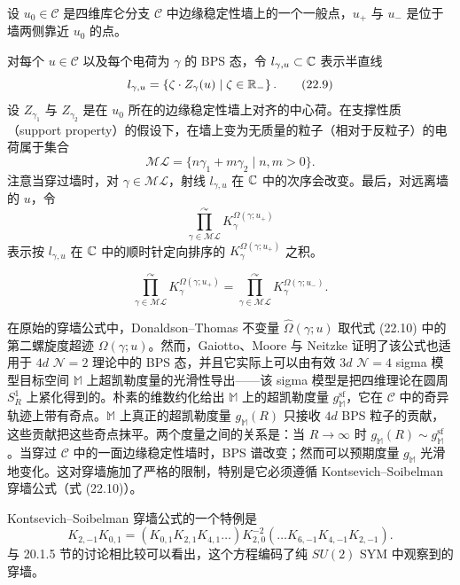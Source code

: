 设 $u_0\in\mathcal{C}$ 是四维库仑分支 $\mathcal{C}$ 中边缘稳定性墙上的一个一般点，$u_+$ 与 $u_-$ 是位于墙两侧靠近 $u_0$ 的点。

对每个 $u\in\mathcal{C}$ 以及每个电荷为 $\gamma$ 的 BPS 态，令 $l_{\gamma,u}\subset\mathbb{C}$ 表示半直线
\begin{equation}
l_{\gamma,u}=\{\zeta\cdot Z_\gamma(u)\mid \zeta\in\mathbb{R}_-\}\,.\tag{22.9}
\end{equation}
设 $Z_{\gamma_1}$ 与 $Z_{\gamma_2}$ 是在 $u_0$ 所在的边缘稳定性墙上对齐的中心荷。在支撑性质（support property）的假设下，在墙上变为无质量的粒子（相对于反粒子）的电荷属于集合
\[
\mathcal{ML}=\{n\gamma_1+m\gamma_2\mid n,m>0\}.
\]
注意当穿过墙时，对 $\gamma\in\mathcal{ML}$，射线 $l_{\gamma,u}$ 在 $\mathbb{C}$ 中的次序会改变。最后，对远离墙的 $u$，令
\[
\overset{\curvearrowright}{\prod_{\gamma\in\mathcal{ML}}}K_\gamma^{\Omega(\gamma;u_+)}
\]
表示按 $l_{\gamma,u}$ 在 $\mathbb{C}$ 中的顺时针定向排序的 $K_\gamma^{\Omega(\gamma;u_+)}$ 之积。

\begin{proposition}
\[
\overset{\curvearrowright}{\prod_{\gamma\in\mathcal{ML}}}K_\gamma^{\Omega(\gamma;u_+)}=\overset{\curvearrowright}{\prod_{\gamma\in\mathcal{ML}}}K_\gamma^{\Omega(\gamma;u_-)}.\tag{22.10}
\]
\end{proposition}

在原始的穿墙公式中，Donaldson–Thomas 不变量 $\widehat{\Omega}(\gamma;u)$ 取代式 (22.10) 中的第二螺旋度超迹 $\Omega(\gamma;u)$。然而，Gaiotto、Moore 与 Neitzke 证明了该公式也适用于 $4d$ $\mathcal{N}=2$ 理论中的 BPS 态，并且它实际上可以由有效 $3d$ $\mathcal{N}=4$ sigma 模型目标空间 $\mathbb{M}$ 上超凯勒度量的光滑性导出——该 sigma 模型是把四维理论在圆周 $S^1_R$ 上紧化得到的。朴素的维数约化给出 $\mathbb{M}$ 上的超凯勒度量 $g^{\mathrm{sf}}_{\mathbb{M}}$，它在 $\mathcal{C}$ 中的奇异轨迹上带有奇点。$\mathbb{M}$ 上真正的超凯勒度量 $g_{\mathbb{M}}(R)$ 只接收 $4d$ BPS 粒子的贡献，这些贡献把这些奇点抹平。两个度量之间的关系是：当 $R\to\infty$ 时 $g_{\mathbb{M}}(R)\sim g^{\mathrm{sf}}_{\mathbb{M}}$。当穿过 $\mathcal{C}$ 中的一面边缘稳定性墙时，BPS 谱改变；然而可以预期度量 $g_{\mathbb{M}}$ 光滑地变化。这对穿墙施加了严格的限制，特别是它必须遵循 Kontsevich–Soibelman 穿墙公式（式 (22.10)）。

\begin{example}[22.13]
Kontsevich–Soibelman 穿墙公式的一个特例是
\[
K_{2,-1}K_{0,1}=(K_{0,1}K_{2,1}K_{4,1}\dots)K_{2,0}^{-2}(\dots K_{6,-1}K_{4,-1}K_{2,-1}).
\]
与 20.1.5 节的讨论相比较可以看出，这个方程编码了纯 $SU(2)$ SYM 中观察到的穿墙。
\end{example}

